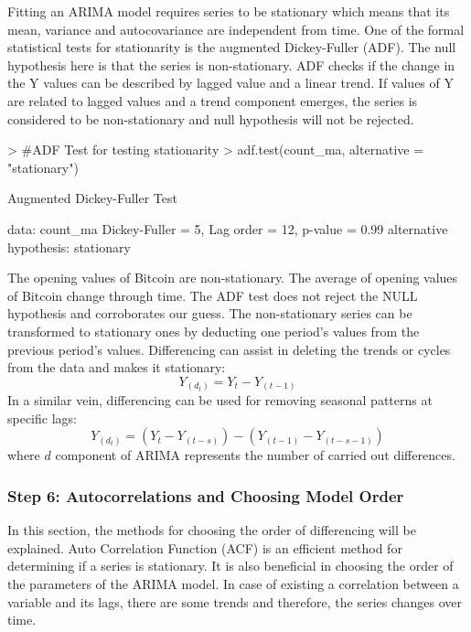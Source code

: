 \documentclass{article}
\begin{document}
Fitting an ARIMA model requires series to be stationary which means that its mean, variance and autocovariance are independent from time. One of the formal statistical tests for stationarity is the augmented Dickey-Fuller (ADF). The null hypothesis here is that the series is non-stationary. ADF checks if the change in the Y values can be described by lagged value and a linear trend. If values of Y are related to lagged values and a trend component emerges, the series is considered to be non-stationary and null hypothesis will not be rejected.
\begin{Schunk}
\begin{Sinput}
> #ADF Test for testing stationarity
> adf.test(count_ma, alternative = "stationary")
\end{Sinput}
\begin{Soutput}
	Augmented Dickey-Fuller Test

data:  count_ma
Dickey-Fuller = 5, Lag order = 12, p-value = 0.99
alternative hypothesis: stationary
\end{Soutput}
\end{Schunk}
The opening values of Bitcoin are non-stationary. The average of opening values of Bitcoin change through time. The ADF test does not reject the NULL hypothesis and corroborates our guess.
The non-stationary series can be transformed to stationary ones by deducting one period's values from the previous period's values. Differencing can assist in deleting the trends or cycles from the data and makes it stationary:
\begin{equation}
Y_(d_t )=Y_t-Y_(t-1)
\end{equation}
In a similar vein, differencing can be used for removing seasonal patterns at specific lags:
\begin{equation}
Y_(d_t )=(Y_t-Y_(t-s) )-(Y_(t-1)-Y_(t-s-1))
\end{equation}
where $d$ component of ARIMA represents the number of carried out differences.

\subsubsection*{Step 6: Autocorrelations and Choosing Model Order}

In this section, the methods for choosing the order of differencing will be explained. Auto Correlation Function (ACF) is an efficient method for determining if a series is stationary. It is also beneficial in choosing the order of the parameters of the ARIMA model.  In case of existing a correlation between a variable and its lags, there are some trends and therefore, the series changes over time. 
\end{document}
